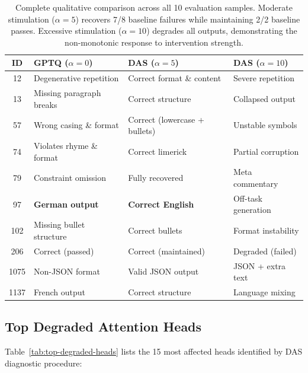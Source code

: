 \begin{table}[t]
\centering
\small
\begin{tabular}{@{}cp{4cm}p{4cm}p{4cm}@{}}
\toprule
\textbf{ID} & \textbf{GPTQ ($\alpha=0$)} & \textbf{DAS ($\alpha=5$)} & \textbf{DAS ($\alpha=10$)} \\
\midrule
12  & Degenerative repetition & Correct format \& content & Severe repetition \\
13  & Missing paragraph breaks & Correct structure & Collapsed output \\
57  & Wrong casing \& format & Correct (lowercase + bullets) & Unstable symbols \\
74  & Violates rhyme \& format & Correct limerick & Partial corruption \\
79  & Constraint omission & Fully recovered & Meta commentary \\
97  & \textbf{German output} & \textbf{Correct English} & Off-task generation \\
102 & Missing bullet structure & Correct bullets & Format instability \\
206 & Correct (passed) & Correct (maintained) & Degraded (failed) \\
1075 & Non-JSON format & Valid JSON output & JSON + extra text \\
1137 & French output & Correct structure & Language mixing \\
\bottomrule
\end{tabular}
\caption{Complete qualitative comparison across all 10 evaluation samples. 
Moderate stimulation ($\alpha=5$) recovers 7/8 baseline failures while 
maintaining 2/2 baseline passes. Excessive stimulation ($\alpha=10$) degrades 
all outputs, demonstrating the non-monotonic response to intervention strength.}
\label{tab:qualitative-full}
\end{table}

\subsection{Top Degraded Attention Heads}
\label{app:per-head-stats}

Table~\ref{tab:top-degraded-heads} lists the 15 most affected heads identified 
by DAS diagnostic procedure:

